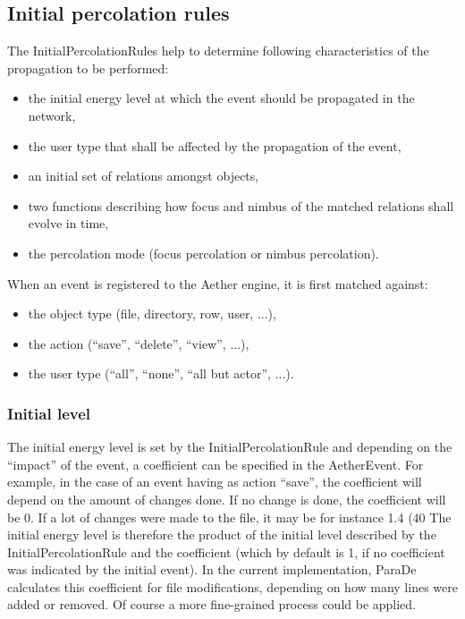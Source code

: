 \documentclass{ecscw2007}
\begin{document}
\subsection*{Initial percolation rules}
The InitialPercolationRules help to determine following characteristics of the propagation to be performed:
\begin{itemize}
   \item the initial energy level at which the event should be propagated in the network,
   \item the user type that shall be affected by the propagation of the event,
   \item an initial set of relations amongst objects,
   \item two functions describing how focus and nimbus of the matched relations shall evolve in time,
   \item the percolation mode (focus percolation or nimbus percolation).
\end{itemize}

When an event is registered to the Aether engine, it is first matched against:
\begin{itemize}
   \item the object type (file, directory, row, user, ...),
   \item the action (“save”, “delete”, “view”, ...),
   \item the user type (“all”, “none”, “all but actor”, ...).
\end{itemize}

\subsubsection*{Initial level}
The initial energy level is set by the InitialPercolationRule and depending on the “impact” of the event, a coefficient can be specified in the AetherEvent. For example, in the case of an event having as action “save”, the coefficient will depend on the amount of changes done. If no change is done, the coefficient will be 0. If a lot of changes were made to the file, it may be for instance 1.4 (40%
The initial energy level is therefore the product of the initial level described by the InitialPercolationRule and the coefficient (which by default is 1, if no coefficient was indicated by the initial event).
In the current implementation, ParaDe calculates this coefficient for file modifications, depending on how many lines were added or removed. Of course a more fine-grained process could be applied.
\end{document}
